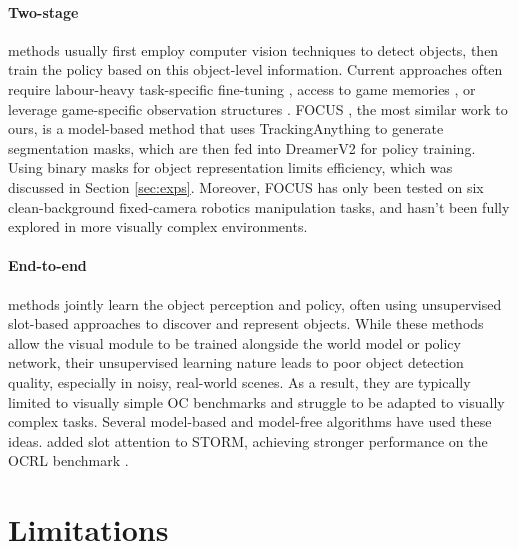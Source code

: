 \documentclass{article} %
\begin{document}
\paragraph{Two-stage} methods usually first employ computer vision techniques to detect objects, then train the policy based on this object-level information.
Current approaches often require labour-heavy task-specific fine-tuning \citep{devin_deep_2017, liu_semantic_2021}, access to game memories \citep{delfosse_ocatari_2024, jain_adityajain1030hkrl_2024}, or leverage game-specific observation structures \citep{stanic_learning_2022}.
FOCUS \citep{ferraro_focus_2023}, the most similar work to ours, is a model-based method that uses TrackingAnything \citep{yang_track_2023} to generate segmentation masks, which are then fed into DreamerV2 \citep{hafner_mastering_2020} for policy training.
Using binary masks for object representation limits efficiency, which was discussed in Section \ref{sec:exps}.
Moreover, FOCUS has only been tested on six clean-background fixed-camera robotics manipulation tasks, and hasn’t been fully explored in more visually complex environments.

\paragraph{End-to-end} methods jointly learn the object perception and policy, often using unsupervised slot-based approaches \citep{locatello_object-centric_2020} to discover and represent objects.
While these methods allow the visual module to be trained alongside the world model or policy network, their unsupervised learning nature leads to poor object detection quality, especially in noisy, real-world scenes.
As a result, they are typically limited to visually simple OC benchmarks \citep{watters_google-deepmindspriteworld_2024, ahmed_causalworld_2020} and struggle to be adapted to visually complex tasks.
Several model-based \citep{veerapaneni_entity_2020, lin_improving_2020, van_bergen_object-based_2023} and model-free \citep{yoon_investigation_2023, haramati_entity-centric_2024} algorithms have used these ideas.
\citet{nakano_learning_2024} added slot attention to STORM, achieving stronger performance on the OCRL benchmark \citep{yoon_investigation_2023}.

\section{Limitations} \label{sec:limitations}
\end{document}
